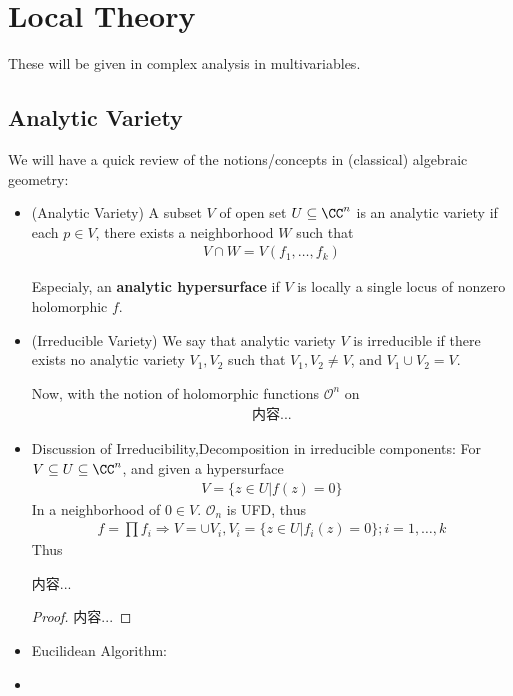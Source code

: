 \documentclass[Total.tex]{subfiles}
\begin{document}
	\chapter{Local Theory}
		These will be given in complex analysis in multivariables.
		
		\section{Analytic Variety}
			We will have a quick review of the notions/concepts in (classical) algebraic geometry:
			\begin{itemize}
				\item (Analytic Variety) A subset $V$ of open set $U\subseteq \CC^n$ is an analytic variety if each $p\in V$, there exists a neighborhood $W$ such that
				\begin{gather*}
					V\cap W=V(f_1,\dots,f_k)
				\end{gather*}
				
				Especialy, an \textbf{analytic hypersurface} if $V$ is locally a single locus of nonzero holomorphic $f$.
				\item (Irreducible Variety) We say that analytic variety $V$ is irreducible if there exists no analytic variety $V_1,V_2$ such that $V_1,V_2\not=V$, and $V_1\cup V_2=V$.
				
				Now, with the notion of holomorphic functions $\mathcal{O}^n$ on 
				\begin{gather*}
					内容...
				\end{gather*}
				\item Discussion of Irreducibility,Decomposition in irreducible components: For $V\subseteq U\subseteq \CC^n$, and given a hypersurface
				\begin{gather*}
					V=\{z\in U|f(z)=0\}
				\end{gather*}
				In a neighborhood of $0\in V$. $\mathcal{O}_n$ is UFD, thus
				\begin{gather*}
					f=\prod f_i\Rightarrow V=\cup V_i,V_i=\{z\in U|f_i(z)=0\};i=1,\dots,k
				\end{gather*}
				Thus
				\begin{proposition}
					内容...
				\end{proposition}
				\begin{proof}
					内容...
				\end{proof}
				\item Eucilidean Algorithm:
				\item 
			\end{itemize}
\end{document}

